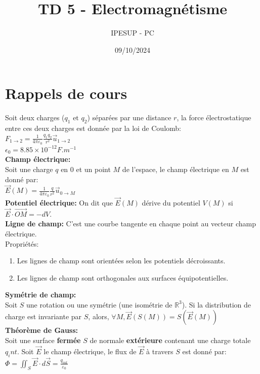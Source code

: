 \documentclass{article}
\title{TD 5 - Electromagnétisme}
\author{IPESUP - PC }
\date{09/10/2024}
\begin{document}
\maketitle

\section{Rappels de cours}

Soit deux charges ($q_1 \text{ et } q_2$) séparées par une distance $r$, la force électrostatique entre ces deux charges est donnée par la loi de Coulomb:\\[0.2cm]
$F_{1 \rightarrow 2} = \frac{1}{4\pi \varepsilon_0} \frac{q_1 q_2}{r^2} \vec{u}_{1 \rightarrow 2}$\\
$\epsilon_0 = 8.85 \times 10^{-12} { F.m^{-1}}$\\[0.1cm]

\textbf{Champ électrique:}\\[0.1cm]
Soit une charge $q$ en $0$ et un point $M$ de l'espace, le champ électrique en $M$ est donné par:\\
$\vec{E}(M) = \frac{1}{4\pi \varepsilon_0} \frac{q}{r^2} \vec{u}_{0 \rightarrow M}$\\

\textbf{Potentiel électrique:} On dit que $\vec{E}(M)$ dérive du potentiel $V(M)$ si $\vec{E} \cdot \vec{OM} = -dV$.\\[0.1cm]

\textbf{Ligne de champ: } C'est une courbe tangente en chaque point au vecteur champ électrique.\\[0.1cm]
Propriétés: 
\begin{enumerate}
    \item Les lignes de champ sont orientées selon les potentiels décroissants.
    \item Les lignes de champ sont orthogonales aux surfaces équipotentielles.\\
\end{enumerate}

\textbf{Symétrie de champ: }\\[0.1cm]
Soit $S$ une rotation ou une symétrie (une isométrie de $\mathbb{R}^3$). Si la distribution  de charge est invariante par $S$, alors, $\forall M, \vec{E}(S(M)) = S(\vec{E}(M))$\\ 

\textbf{Théorème de Gauss: }\\[0.1cm]
Soit une surface \textbf{fermée} $S$ de normale \textbf{extérieure} contenant une charge totale $q_int$. Soit $\vec{E}$ le champ électrique, le flux de $\vec{E}$ à travers $S$ est donné par:\\
$\Phi = \iint_S \vec{E} \cdot d\vec{S} = \frac{q_{int}}{\varepsilon_0}$\\
\end{document}
